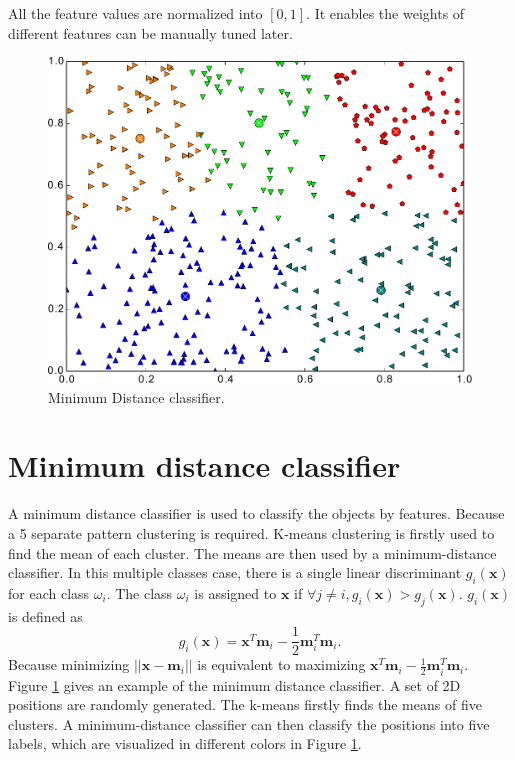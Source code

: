 \documentclass[paper=a4, fontsize=11pt]{scrartcl}
\begin{document}
All the feature values are normalized into $ [0, 1] $.
It enables the weights of different features can be manually tuned later.

\begin{figure}[h]
\centering
\includegraphics[width=0.7\linewidth]{./figure/kmean}
\caption{Minimum Distance classifier.}
\label{fig:min_dist_classifer}
\end{figure}

\section{Minimum distance classifier}
\label{sec:classifier}

A minimum distance classifier is used to classify the objects by features.
Because a 5 separate pattern clustering is required.
K-means clustering is firstly used to find the mean of each cluster.
The means are then used by a minimum-distance classifier.
In this multiple classes case, there is a single linear discriminant $ g_{i} ( \mathbf{x} ) $ for each class $ \omega_{i} $.
The class $ \omega_{i} $ is assigned to $ \mathbf{x} $ if $ \forall j \neq i, g_{i} ( \mathbf{x} ) > g_{j} ( \mathbf{x} ) $.
$ g_{i}( \mathbf{x} ) $ is defined as 
\begin{equation}
g_{i}( \mathbf{x} ) = \mathbf{x}^{T} \mathbf{m}_{i} - \frac{1}{2} \mathbf{m}_{i}^{T} \mathbf{m}_{i}.
\end{equation}
Because minimizing $ || \mathbf{x} - \mathbf{m}_{i} || $ is equivalent to maximizing $ \mathbf{x}^{T} \mathbf{m}_{i} - \frac{1}{2} \mathbf{m}_{i}^{T} \mathbf{m}_{i} $.
Figure \ref{fig:min_dist_classifer} gives an example of the minimum distance classifier.
A set of 2D positions are randomly generated.
The k-means firstly finds the means of five clusters.
A minimum-distance classifier can then classify the positions into five labels, which are visualized in different colors in Figure \ref{fig:min_dist_classifer}.
\end{document}
